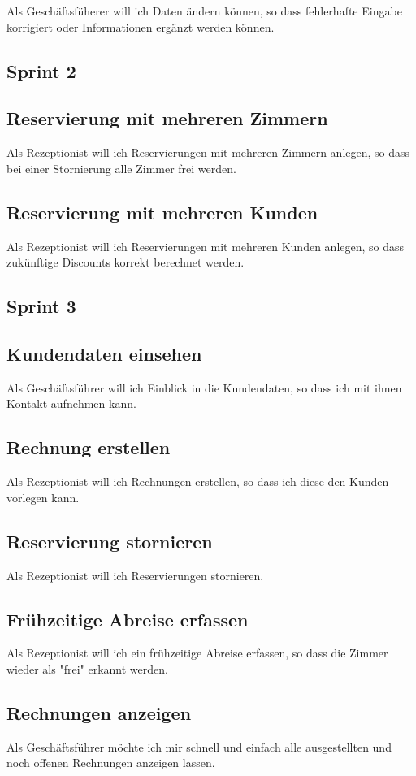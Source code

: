 \documentclass[11pt]{scrartcl}
\begin{document}
Als Geschäftsfüherer will ich Daten ändern können, so dass fehlerhafte Eingabe korrigiert oder Informationen ergänzt werden können.

\subsection{Sprint 2}

\subsection{Reservierung mit mehreren Zimmern}

Als Rezeptionist will ich Reservierungen mit mehreren Zimmern anlegen, so dass bei einer Stornierung alle Zimmer frei werden.

\subsection{Reservierung mit mehreren Kunden}

Als Rezeptionist will ich Reservierungen mit mehreren Kunden anlegen, so dass zukünftige Discounts korrekt berechnet werden.

\subsection{Sprint 3}

\subsection{Kundendaten einsehen}

Als Geschäftsführer will ich Einblick in die Kundendaten, so dass ich mit ihnen Kontakt aufnehmen kann.

\subsection{Rechnung erstellen}

Als Rezeptionist will ich Rechnungen erstellen, so dass ich diese den Kunden vorlegen kann.

\subsection{Reservierung stornieren}

Als Rezeptionist will ich Reservierungen stornieren.

\subsection{Frühzeitige Abreise erfassen}

Als Rezeptionist will ich ein frühzeitige Abreise erfassen, so dass die Zimmer wieder als "frei" erkannt werden.


\subsection{Rechnungen anzeigen}

Als Geschäftsführer möchte ich mir schnell und einfach alle ausgestellten und noch offenen Rechnungen anzeigen lassen.
\end{document}
